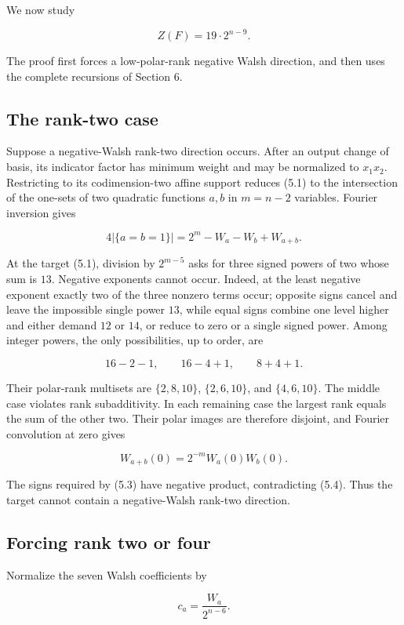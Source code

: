 \documentclass[11pt]{article}
\theoremstyle{remark}
\numberwithin{equation}{section}
\begin{document}
We now study

\[
Z(F)=19\cdot2^{n-9}.                             \tag{5.1}
\]

The proof first forces a low-polar-rank negative Walsh direction, and then uses
the complete recursions of Section 6.

\subsection{The rank-two case}


Suppose a negative-Walsh rank-two direction occurs. After an output change of
basis, its indicator factor has minimum weight and may be normalized to
\(x_1x_2\). Restricting to its codimension-two affine support reduces (5.1) to
the intersection of the one-sets of two quadratic functions \(a,b\) in
\(m=n-2\) variables. Fourier inversion gives

\[
4|\{a=b=1\}|=2^m-W_a-W_b+W_{a+b}.               \tag{5.2}
\]

At the target (5.1), division by \(2^{m-5}\) asks for three signed powers of two
whose sum is \(13\). Negative exponents cannot occur. Indeed, at the least
negative exponent exactly two of the three nonzero terms occur; opposite signs
cancel and leave the impossible single power \(13\), while equal signs combine
one level higher and either demand \(12\) or \(14\), or reduce to zero or a
single signed power. Among integer powers, the only possibilities, up to order,
are

\[
16-2-1,\qquad 16-4+1,\qquad 8+4+1.             \tag{5.3}
\]

Their polar-rank multisets are \(\{2,8,10\}\), \(\{2,6,10\}\), and
\(\{4,6,10\}\). The middle case violates rank subadditivity. In each remaining
case the largest rank equals the sum of the other two. Their polar images are
therefore disjoint, and Fourier convolution at zero gives

\[
W_{a+b}(0)=2^{-m}W_a(0)W_b(0).                  \tag{5.4}
\]

The signs required by (5.3) have negative product, contradicting (5.4). Thus
the target cannot contain a negative-Walsh rank-two direction.

\subsection{Forcing rank two or four}


Normalize the seven Walsh coefficients by

\[
c_a=\frac{W_a}{2^{n-6}}.
\]
\end{document}
